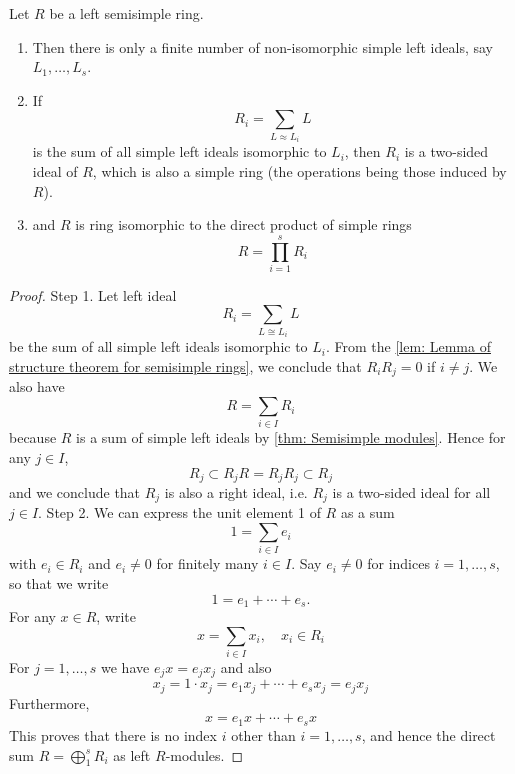\begin{theorem}
    \label{thm: Structure of semisimple rings}
    Let $R$ be a left semisimple ring.
    \begin{enumerate} \item Then there is only a finite number of non-isomorphic simple left ideals, say $L_1, \ldots, L_s$. \item If \begin{equation*} R_i=\sum_{L \approx L_i} L \end{equation*} is the sum of all simple left ideals isomorphic to $L_i$, then $R_i$ is a two-sided ideal of $R$, which is also a simple ring (the operations being those induced by $R$). \item and $R$ is ring isomorphic to the direct product of simple rings \begin{equation*} R=\prod_{i=1}^s R_i \end{equation*}
    \end{enumerate}
    \begin{proof}
        Step 1. Let left ideal
        \begin{equation*}
            R_i=\sum_{L\cong L_i} L
        \end{equation*}
        be the sum of all simple left ideals isomorphic to $L_i$. From the \cref{lem: Lemma of structure theorem for semisimple rings}, we conclude that $R_i R_j=0$ if $i \neq j$. We also have
        \begin{equation*}
            R=\sum_{i \in I} R_i
        \end{equation*}
        because $R$ is a sum of simple left ideals by \cref{thm: Semisimple modules}. Hence for any $j \in I$,
        \begin{equation*}
            R_j \subset R_j R=R_j R_j \subset R_j
        \end{equation*}
        and we conclude that $R_j$ is also a right ideal, i.e. $R_j$ is a two-sided ideal for all $j \in I$. Step 2. We can express the unit element 1 of $R$ as a sum
        \begin{equation*}
            1=\sum_{i \in I} e_i
        \end{equation*}
        with $e_i \in R_i$ and $e_i \neq 0$ for finitely many $i \in I$. Say $e_i \neq 0$ for indices $i=1, \ldots, s$, so that we write
        \begin{equation*}
            1=e_1+\cdots+e_s .
        \end{equation*}
        For any $x \in R$, write
        \begin{equation*}
            x=\sum_{i \in I} x_i, \quad x_i \in R_i
        \end{equation*}
        For $j=1, \ldots, s$ we have $e_j x=e_j x_j$ and also
        \begin{equation*}
            x_j=1 \cdot x_j=e_1 x_j+\cdots+e_s x_j=e_j x_j \end{equation*} Furthermore, \begin{equation*} x=e_1 x+\cdots+e_s x
        \end{equation*}
        This proves that there is no index $i$ other than $i=1, \ldots, s$, and hence the direct sum $R=\bigoplus_1^s R_i$ as left $R$-modules.


\end{proof}
\end{theorem}
